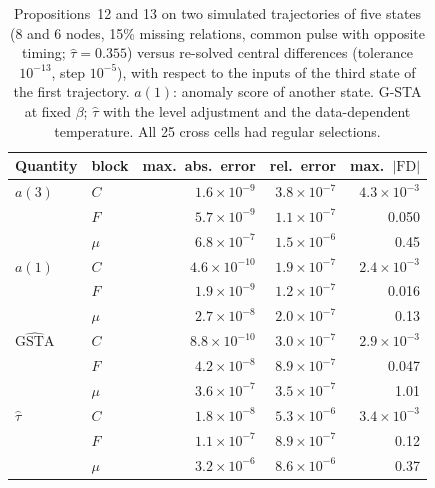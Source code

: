 \documentclass[12pt]{article}
\begin{document}
\begin{table}[h]
\caption{Propositions~12 and 13 on two simulated trajectories of five states (8 and 6 nodes, 15\% missing relations, common pulse with opposite timing; $\hat\tau=0.355$) versus re-solved central differences (tolerance $10^{-13}$, step $10^{-5}$), with respect to the inputs of the third state of the first trajectory. $a(1)$: anomaly score of another state. G-STA at fixed $\beta$; $\hat\tau$ with the level adjustment and the data-dependent temperature. All 25 cross cells had regular selections.}\label{tab:sensverif2}
\centering\footnotesize
\begin{tabular}{llrrr}
\toprule
Quantity & block & max.\ abs.\ error & rel.\ error & max.\ $|\mathrm{FD}|$\\
\midrule
$a(3)$ & $C$ & $1.6\times10^{-9}$ & $3.8\times10^{-7}$ & $4.3\times10^{-3}$\\
 & $F$ & $5.7\times10^{-9}$ & $1.1\times10^{-7}$ & 0.050\\
 & $\mu$ & $6.8\times10^{-7}$ & $1.5\times10^{-6}$ & 0.45\\
$a(1)$ & $C$ & $4.6\times10^{-10}$ & $1.9\times10^{-7}$ & $2.4\times10^{-3}$\\
 & $F$ & $1.9\times10^{-9}$ & $1.2\times10^{-7}$ & 0.016\\
 & $\mu$ & $2.7\times10^{-8}$ & $2.0\times10^{-7}$ & 0.13\\
$\widehat{\mathrm{GSTA}}$ & $C$ & $8.8\times10^{-10}$ & $3.0\times10^{-7}$ & $2.9\times10^{-3}$\\
 & $F$ & $4.2\times10^{-8}$ & $8.9\times10^{-7}$ & 0.047\\
 & $\mu$ & $3.6\times10^{-7}$ & $3.5\times10^{-7}$ & 1.01\\
$\hat\tau$ & $C$ & $1.8\times10^{-8}$ & $5.3\times10^{-6}$ & $3.4\times10^{-3}$\\
 & $F$ & $1.1\times10^{-7}$ & $8.9\times10^{-7}$ & 0.12\\
 & $\mu$ & $3.2\times10^{-6}$ & $8.6\times10^{-6}$ & 0.37\\
\bottomrule
\end{tabular}
\end{table}
\end{document}
